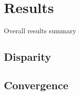 \chapter{Results}
\label{chap:results}



\noindent
Overall results summary

\section{Disparity}




\section{Convergence}





